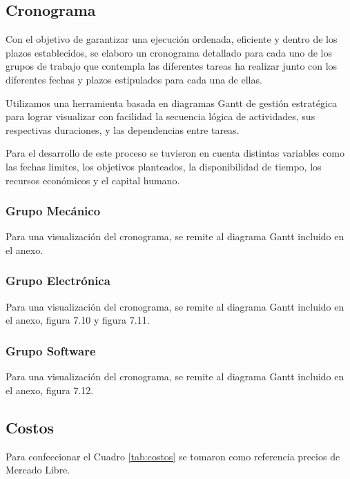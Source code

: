   \subsection{Cronograma}
    Con el objetivo de garantizar una ejecución ordenada, eficiente y dentro de los plazos
    establecidos, se elaboro un cronograma detallado para cada uno de los grupos de trabajo que
    contempla las diferentes tareas ha realizar junto con los diferentes fechas y plazos estipulados
    para cada una de ellas.

    Utilizamos una herramienta basada en diagramas Gantt de gestión estratégica para lograr
    visualizar con facilidad la secuencia lógica de actividades, sus respectivas duraciones, y las
    dependencias entre tareas.

    Para el desarrollo de este proceso se tuvieron en cuenta distintas variables como las fechas
    limites, los objetivos planteados, la disponibilidad de tiempo, los recursos económicos y el
    capital humano.

    \subsubsection{Grupo Mecánico}
    Para una visualización del cronograma, se remite al diagrama Gantt incluido en el anexo.
    \subsubsection{Grupo Electrónica}
    Para una visualización del cronograma, se remite al diagrama Gantt incluido en el anexo,
    figura 7.10 y figura 7.11.
    \subsubsection{Grupo Software}
    Para una visualización del cronograma, se remite al diagrama Gantt incluido en el anexo,
    figura 7.12.

  \subsection{Costos}
    Para confeccionar el Cuadro \ref{tab:costos} se tomaron como referencia precios de
    Mercado Libre.


